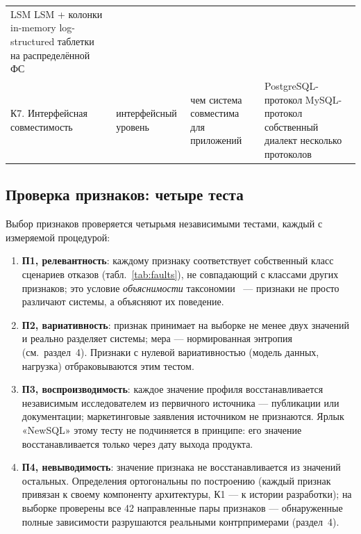 \documentclass{misisarticle}
\begin{document}
\begin{table}[t]
\begin{tabular}{>{\raggedright\arraybackslash}p{2.7cm}>{\raggedright\arraybackslash}p{3.1cm}>{\raggedright\arraybackslash}p{4.3cm}>{\raggedright\arraybackslash}p{5.3cm}}
LSM \newline
LSM + колонки \newline
in-memory \newline
log-structured \newline
таблетки на распределённой ФС \\
\addlinespace
К7. Интерфейсная совместимость & интерфейсный уровень & чем система совместима для приложений &
PostgreSQL-протокол \newline
MySQL-протокол \newline
собственный диалект \newline
несколько протоколов \\
\bottomrule
\end{tabular}
\end{table}

\subsection{Проверка признаков: четыре теста}

Выбор признаков проверяется четырьмя независимыми тестами, каждый с измеряемой процедурой:

\begin{enumerate}
\item \textbf{П1, релевантность}: каждому признаку соответствует собственный класс сценариев отказов (табл.~\ref{tab:faults}), не совпадающий с классами других признаков; это условие \emph{объяснимости} таксономии~\cite{nickerson} --- признаки не просто различают системы, а объясняют их поведение.
\item \textbf{П2, вариативность}: признак принимает на выборке не менее двух значений и реально разделяет системы; мера --- нормированная энтропия (см.~раздел~4). Признаки с нулевой вариативностью (модель данных, нагрузка) отбраковываются этим тестом.
\item \textbf{П3, воспроизводимость}: каждое значение профиля восстанавливается независимым исследователем из первичного источника --- публикации или документации; маркетинговые заявления источником не признаются. Ярлык «NewSQL» этому тесту не подчиняется в принципе: его значение восстанавливается только через дату выхода продукта.
\item \textbf{П4, невыводимость}: значение признака не восстанавливается из значений остальных. Определения ортогональны по построению (каждый признак привязан к своему компоненту архитектуры, К1 --- к истории разработки); на выборке проверены все 42 направленные пары признаков --- обнаруженные полные зависимости разрушаются реальными контрпримерами (раздел~4).
\end{enumerate}
\end{document}
